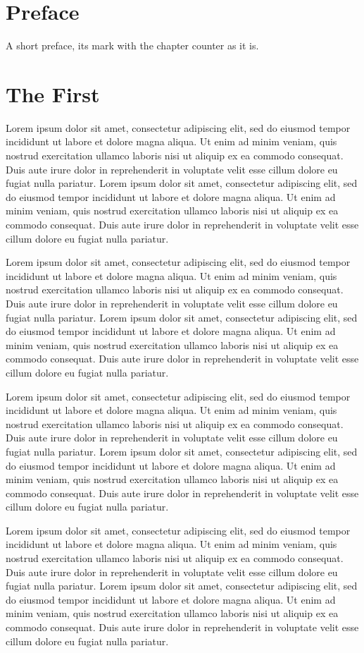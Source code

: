 \documentclass{book}
\begin{document}
\frontmatter
\chapter{Preface}
A short preface, its mark with the chapter counter as it is.
\mainmatter
\chapter{The First}
Lorem ipsum dolor sit amet, consectetur adipiscing elit, sed do eiusmod tempor incididunt ut labore et dolore magna aliqua. Ut enim ad minim veniam, quis nostrud exercitation ullamco laboris nisi ut aliquip ex ea commodo consequat. Duis aute irure dolor in reprehenderit in voluptate velit esse cillum dolore eu fugiat nulla pariatur. Lorem ipsum dolor sit amet, consectetur adipiscing elit, sed do eiusmod tempor incididunt ut labore et dolore magna aliqua. Ut enim ad minim veniam, quis nostrud exercitation ullamco laboris nisi ut aliquip ex ea commodo consequat. Duis aute irure dolor in reprehenderit in voluptate velit esse cillum dolore eu fugiat nulla pariatur.

Lorem ipsum dolor sit amet, consectetur adipiscing elit, sed do eiusmod tempor incididunt ut labore et dolore magna aliqua. Ut enim ad minim veniam, quis nostrud exercitation ullamco laboris nisi ut aliquip ex ea commodo consequat. Duis aute irure dolor in reprehenderit in voluptate velit esse cillum dolore eu fugiat nulla pariatur. Lorem ipsum dolor sit amet, consectetur adipiscing elit, sed do eiusmod tempor incididunt ut labore et dolore magna aliqua. Ut enim ad minim veniam, quis nostrud exercitation ullamco laboris nisi ut aliquip ex ea commodo consequat. Duis aute irure dolor in reprehenderit in voluptate velit esse cillum dolore eu fugiat nulla pariatur.

Lorem ipsum dolor sit amet, consectetur adipiscing elit, sed do eiusmod tempor incididunt ut labore et dolore magna aliqua. Ut enim ad minim veniam, quis nostrud exercitation ullamco laboris nisi ut aliquip ex ea commodo consequat. Duis aute irure dolor in reprehenderit in voluptate velit esse cillum dolore eu fugiat nulla pariatur. Lorem ipsum dolor sit amet, consectetur adipiscing elit, sed do eiusmod tempor incididunt ut labore et dolore magna aliqua. Ut enim ad minim veniam, quis nostrud exercitation ullamco laboris nisi ut aliquip ex ea commodo consequat. Duis aute irure dolor in reprehenderit in voluptate velit esse cillum dolore eu fugiat nulla pariatur.

Lorem ipsum dolor sit amet, consectetur adipiscing elit, sed do eiusmod tempor incididunt ut labore et dolore magna aliqua. Ut enim ad minim veniam, quis nostrud exercitation ullamco laboris nisi ut aliquip ex ea commodo consequat. Duis aute irure dolor in reprehenderit in voluptate velit esse cillum dolore eu fugiat nulla pariatur. Lorem ipsum dolor sit amet, consectetur adipiscing elit, sed do eiusmod tempor incididunt ut labore et dolore magna aliqua. Ut enim ad minim veniam, quis nostrud exercitation ullamco laboris nisi ut aliquip ex ea commodo consequat. Duis aute irure dolor in reprehenderit in voluptate velit esse cillum dolore eu fugiat nulla pariatur.
\end{document}
